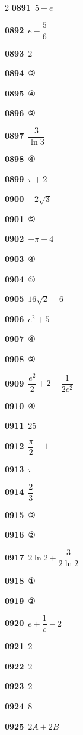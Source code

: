 \documentclass[10pt,a4paper]{article}
\begin{document}
\begin{multicols}{2}
\noindent\textbf{0891}\ $5-e$\par
\noindent\textbf{0892}\ $e-\dfrac{5}{6}$\par
\noindent\textbf{0893}\ $2$\par
\noindent\textbf{0894}\ ③\par
\noindent\textbf{0895}\ ④\par
\noindent\textbf{0896}\ ②\par
\noindent\textbf{0897}\ $\dfrac{3}{\ln 3}$\par
\noindent\textbf{0898}\ ④\par
\noindent\textbf{0899}\ $\pi+2$\par
\noindent\textbf{0900}\ $-2\sqrt{3}$\par
\noindent\textbf{0901}\ ⑤\par
\noindent\textbf{0902}\ $-\pi-4$\par
\noindent\textbf{0903}\ ④\par
\noindent\textbf{0904}\ ⑤\par
\noindent\textbf{0905}\ $16\sqrt{2}-6$\par
\noindent\textbf{0906}\ $e^2+5$\par
\noindent\textbf{0907}\ ④\par
\noindent\textbf{0908}\ ②\par
\noindent\textbf{0909}\ $\dfrac{e^2}{2}+2-\dfrac{1}{2e^2}$\par
\noindent\textbf{0910}\ ④\par
\noindent\textbf{0911}\ $25$\par
\noindent\textbf{0912}\ $\dfrac{\pi}{2}-1$\par
\noindent\textbf{0913}\ $\pi$\par
\noindent\textbf{0914}\ $\dfrac{2}{3}$\par
\noindent\textbf{0915}\ ③\par
\noindent\textbf{0916}\ ②\par
\noindent\textbf{0917}\ $2\ln 2+\dfrac{3}{2\ln 2}$\par
\noindent\textbf{0918}\ ①\par
\noindent\textbf{0919}\ ②\par
\noindent\textbf{0920}\ $e+\dfrac{1}{e}-2$\par
\noindent\textbf{0921}\ $2$\par
\noindent\textbf{0922}\ $2$\par
\noindent\textbf{0923}\ $2$\par
\noindent\textbf{0924}\ $8$\par
\noindent\textbf{0925}\ $2A+2B$\par

\end{multicols}
\end{document}
